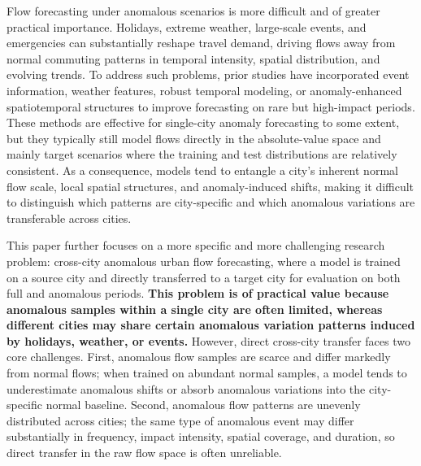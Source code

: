 Flow forecasting under anomalous scenarios is more difficult and of greater practical importance. Holidays, extreme weather, large-scale events, and emergencies can substantially reshape travel demand, driving flows away from normal commuting patterns in temporal intensity, spatial distribution, and evolving trends. To address such problems, prior studies have incorporated event information, weather features, robust temporal modeling, or anomaly-enhanced spatiotemporal structures to improve forecasting on rare but high-impact periods. These methods are effective for single-city anomaly forecasting to some extent, but they typically still model flows directly in the absolute-value space and mainly target scenarios where the training and test distributions are relatively consistent. As a consequence, models tend to entangle a city's inherent normal flow scale, local spatial structures, and anomaly-induced shifts, making it difficult to distinguish which patterns are city-specific and which anomalous variations are transferable across cities.


This paper further focuses on a more specific and more challenging research problem: cross-city anomalous urban flow forecasting, where a model is trained on a source city and directly transferred to a target city for evaluation on both full and anomalous periods.
\textbf{This problem is of practical value because anomalous samples within a single city are often limited, whereas different cities may share certain anomalous variation patterns induced by holidays, weather, or events.} However, direct cross-city transfer faces two core challenges. First, anomalous flow samples are scarce and differ markedly from normal flows; when trained on abundant normal samples, a model tends to underestimate anomalous shifts or absorb anomalous variations into the city-specific normal baseline. Second, anomalous flow patterns are unevenly distributed across cities; the same type of anomalous event may differ substantially in frequency, impact intensity, spatial coverage, and duration, so direct transfer in the raw flow space is often unreliable.

